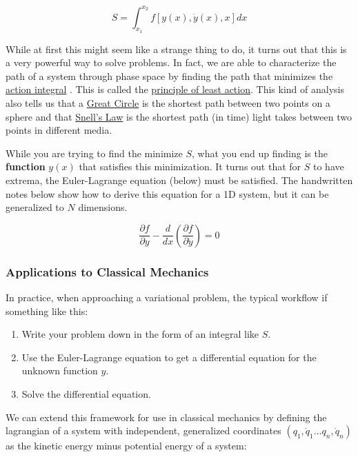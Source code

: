 \[
S = \int_{x_1}^{x_2} f[y(x),\dot{y}(x),x] dx
\]

While at first this might seem like a strange thing to do, it turns out
that this is a very powerful way to solve problems. In fact, we are able
to characterize the path of a system through phase space by finding the
path that minimizes the
\href{https://en.wikipedia.org/wiki/Action_(physics)}{action integral} .
This is called the
\href{https://en.wikipedia.org/wiki/Stationary-action_principle}{principle
of least action}. This kind of analysis also tells us that a
\href{https://en.wikipedia.org/wiki/Great_circle}{Great Circle} is the
shortest path between two points on a sphere and that
\href{https://en.wikipedia.org/wiki/Snell\%27s_law}{Snell's Law} is the
shortest path (in time) light takes between two points in different
media.

While you are trying to find the minimize \(S\), what you end up finding
is the \textbf{function} \(y(x)\) that satisfies this minimization. It
turns out that for \(S\) to have extrema, the Euler-Lagrange equation
(below) must be satisfied. The handwritten notes below show how to
derive this equation for a 1D system, but it can be generalized to \(N\)
dimensions.

\[
\frac{\partial f}{\partial y} - \frac{d}{dx}\left(\frac{\partial f}{\partial \dot{y}} \right) = 0
\]

\subsubsection{Applications to Classical
Mechanics}\label{applications-to-classical-mechanics}

In practice, when approaching a variational problem, the typical
workflow if something like this:

\begin{enumerate}
\def\labelenumi{\arabic{enumi}.}
\tightlist
\item
  Write your problem down in the form of an integral like \(S\).
\item
  Use the Euler-Lagrange equation to get a differential equation for the
  unknown function \(y\).
\item
  Solve the differential equation.
\end{enumerate}

We can extend this framework for use in classical mechanics by defining
the lagrangian of a system with independent, generalized coordinates
\((q_1,\dot{q}_1... q_n,\dot{q}_n)\) as the kinetic energy minus
potential energy of a system:

